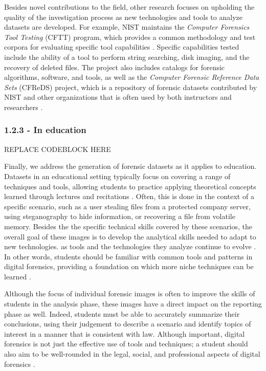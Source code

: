 Besides novel contributions to the field, other research focuses on
upholding the quality of the investigation process as new technologies
and tools to analyze datasets are developed. For example, NIST maintains
the \emph{Computer Forensics Tool Testing} (CFTT) program, which
provides a common methodology and test corpora for evaluating specific
tool capabilities
\cite{nationalinstituteofstandardsandtechnologyComputerForensicsTool2017}.
Specific capabilities tested include the ability of a tool to perform
string searching, disk imaging, and the recovery of deleted files. The
project also includes catalogs for forensic algorithms, software, and
tools, as well as the \emph{Computer Forensic Reference Data Sets}
(CFReDS) project, which is a repository of forensic datasets contributed
by NIST and other organizations that is often used by both instructors
and researchers
\cite{nationalinstituteofstandardsandtechnologyCFReDSPortal}.

\subsubsection{1.2.3 - In education}\label{in-education}

REPLACE CODEBLOCK HERE

Finally, we address the generation of forensic datasets as it applies to
education. Datasets in an educational setting typically focus on
covering a range of techniques and tools, allowing students to practice
applying theoretical concepts learned through lectures and recitations
\cite{adelsteinAutomaticallyCreatingRealistic2005}. Often, this is
done in the context of a specific scenario, such as a user stealing
files from a protected company server, using steganography to hide
information, or recovering a file from volatile memory. Besides the the
specific technical skills covered by these scenarios, the overall goal
of these images is to develop the analytical skills needed to adapt to
new technologies. as tools and the technologies they analyze continue to
evolve \cite{cooperStandardsDigitalForensics2010}. In other words,
students should be familiar with common tools and patterns in digital
forensics, providing a foundation on which more niche techniques can be
learned \cite{lawrenceFrameworkDesignWebbased2009}.

Although the focus of individual forensic images is often to improve the
skills of students in the analysis phase, these images have a direct
impact on the reporting phase as well. Indeed, students must be able to
accurately summarize their conclusions, using their judgement to
describe a scenario and identify topics of interest in a manner that is
consistent with law. Although important, digital forensics is not just
the effective use of tools and techniques; a student should also aim to
be well-rounded in the legal, social, and professional aspects of
digital forensics \cite{andersonComparativeStudyTeaching2006}.

